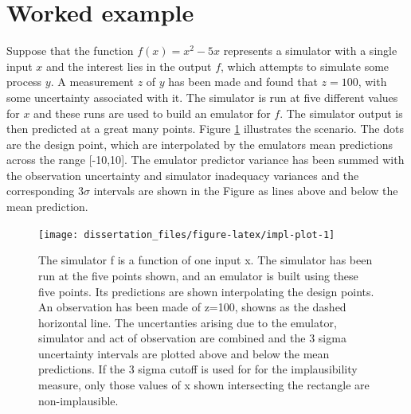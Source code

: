 \documentclass[
  12pt,
  a4paper,
  twoside]{book}
\begin{document}
\hypertarget{hm-worked-example}{%
\section{Worked example}\label{hm-worked-example}}

Suppose that the function \(f(x) = x^2-5x\) represents a simulator with a single input \(x\) and the interest lies in the output \(f\), which attempts to simulate some process \(y\). A measurement \(z\) of \(y\) has been made and found that \(z=100\), with some uncertainty associated with it. The simulator is run at five different values for \(x\) and these runs are used to build an emulator for \(f\). The simulator output is then predicted at a great many points. Figure \ref{fig:impl-plot} illustrates the scenario. The dots are the design point, which are interpolated by the emulators mean predictions across the range {[}-10,10{]}. The emulator predictor variance has been summed with the observation uncertainty and simulator inadequacy variances and the corresponding 3\(\sigma\) intervals are shown in the Figure as lines above and below the mean prediction.

\begin{figure}[H]

{\centering \texttt{[image: dissertation\_files/figure-latex/impl-plot-1]} 

}

\caption{The simulator f is a function of one input x. The simulator has been run at the five points shown, and an emulator is built using these five points. Its predictions are shown interpolating the design points. An observation has been made of z=100, showns as the dashed horizontal line. The uncertanties arising due to the emulator, simulator and act of observation are combined and the 3 sigma uncertainty intervals are plotted above and below the mean predictions. If the 3 sigma cutoff is used for for the implausibility measure, only those values of x shown intersecting the rectangle are non-implausible.}\label{fig:impl-plot}
\end{figure}
\end{document}
